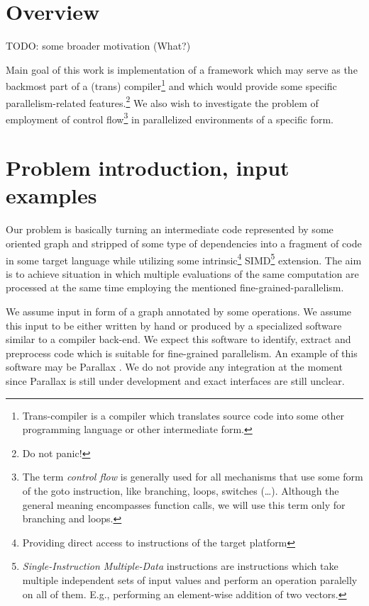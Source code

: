 
\section{Overview}

TODO: some broader motivation (What?)

Main goal of this work is implementation of a framework which may serve as the backmost part of a (trans) compiler\footnote{Trans-compiler is a compiler which translates source code into some other programming language or other intermediate form.} and which would provide some specific parallelism-related features.\footnote{Do not panic!} We also wish to investigate the problem of employment of control flow\footnote{The term \emph{control flow} is generally used for all mechanisms that use some form of the goto instruction, like branching, loops, switches (\dots). Although the general meaning encompasses function calls, we will use this term only for branching and loops.} in parallelized environments of a specific form.

\section{Problem introduction, input examples}

Our problem is basically turning an intermediate code represented by some oriented graph and stripped of some type of dependencies into a fragment of code in some target language while utilizing some intrinsic\footnote{Providing direct access to instructions of the target platform} SIMD\footnote{\emph{Single-Instruction Multiple-Data} instructions are instructions which take multiple independent sets of input values and perform an operation paralelly on all of them. E.g., performing an element-wise addition of two vectors.} extension. The aim is to achieve situation in which multiple evaluations of the same computation are processed at the same time employing the mentioned fine-grained-parallelism. 


We assume input in form of a graph annotated by some operations. We assume this input to be either written by hand or produced by a specialized software similar to a compiler back-end. We expect this software to identify, extract and preprocess code which is suitable for fine-grained parallelism.  An example of this software may be Parallax \cite{parallax}. We do not provide any integration at the moment since Parallax is still under development and exact interfaces are still unclear.



